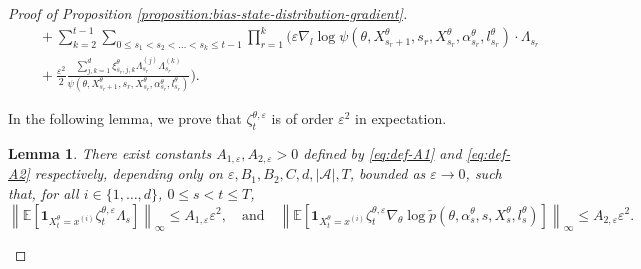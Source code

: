 \documentclass[11pt]{article}
\numberwithin{equation}{section}
\newtheorem{lemma}[theorem]{Lemma}
\theoremstyle{definition}
\theoremstyle{remark}
\def\eps{\varepsilon}
\def\cA{\mathcal{A}}
\begin{document}
\begin{proof}[Proof of Proposition \ref{proposition:bias-state-distribution-gradient}]
\begin{equation}
\begin{aligned}
& \quad + \sum_{k = 2}^{t-1} \sum_{0 \leq s_1 < s_2 < \ldots < s_k \leq t-1} \prod_{r = 1}^k \Bigg( \eps \nabla_l \log \psi(\theta, X^\theta_{s_r + 1}, s_r,X_{s_r}^\theta, \alpha_{s_r}^\theta, l_{s_r}^\theta) \cdot \Lambda_{s_r} \\
& \quad+ \frac{\eps^2}{2} \frac{\sum_{j,k=1}^d \xi^\theta_{s_r,j,k} \Lambda_{s_r}^{(j)} \Lambda_{s_r}^{(k)}}{\psi(\theta, X_{s_r + 1}^\theta,s_r,  X_{s_r}^\theta, \alpha_{s_r}^\theta, l_{s_r}^\theta)} \Bigg).
\end{aligned}
\end{equation}

In the following lemma, we prove that $\zeta_t^{\theta, \eps}$ is of order $\eps^2$ in expectation.
\begin{lemma}
\label{lemma:zeta-remainder}
     There exist constants $A_{1,\eps},A_{2,\eps} > 0$ defined by \eqref{eq:def-A1} and \eqref{eq:def-A2} respectively, depending only on $ \eps,B_1,B_2, C, d, | \cA |, T$, bounded as $\eps \to 0$, such that, for all $i \in \{1, \ldots, d\}$, $0 \leq s < t \leq T$, 
\[
\left\| \mathbb E \left[ \mathbf 1_{X_t^\theta = x^{(i)}} \zeta_t^{\theta, \eps} \Lambda_s  \right] \right\|_{\infty} \leq A_{1,\eps} \eps^2, \quad \text{and} \quad \left\| \mathbb E \left[ \mathbf 1_{X_t^\theta = x^{(i)}} \zeta_t^{\theta, \eps} \nabla_\theta \log \tilde p (\theta, \alpha_s^{\theta}, s,X_s^\theta, l_s^\theta) \right] \right\|_{\infty} \leq A_{2,\eps} \eps^2.
\]
\end{lemma}


\end{proof}
\end{document}
